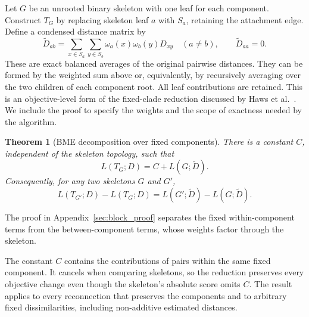 \documentclass[11pt,a4paper]{article}
\makeatletter
\DeclareRobustCommand{\_}{\ifmmode\nfss@text{\textunderscore}\else\textunderscore\allowbreak\fi}
\newtheorem{theorem}{Theorem}[section]
\theoremstyle{definition}
\makeatother
\begin{document}
Let $G$ be an unrooted binary skeleton with one leaf for each component.
Construct $T_G$ by replacing skeleton leaf $a$ with $S_a$, retaining the attachment edge.
Define a condensed distance matrix by
\begin{equation}
 \widetilde D_{ab}
 =\sum_{x\in S_a}\sum_{y\in S_b}
    \omega_a(x)\omega_b(y)D_{xy}\quad(a\ne b),
 \qquad \widetilde D_{aa}=0.
 \label{eq:condensed_D}
\end{equation}
These are exact balanced averages of the original pairwise distances.
They can be formed by the weighted sum above or, equivalently, by recursively averaging over the two children of each component root.
All leaf contributions are retained.
This is an objective-level form of the fixed-clade reduction discussed by Haws et al.~\cite[Section~2.4]{haws2011optimality}.
We include the proof to specify the weights and the scope of exactness needed by the algorithm.

\begin{theorem}[BME decomposition over fixed components]
\label{thm:clade_condense}
There is a constant $C$, independent of the skeleton topology, such that
\begin{equation}
 L(T_G;D)=C+L(G;\widetilde D).
 \label{eq:bme_condense_decomp}
\end{equation}
Consequently, for any two skeletons $G$ and $G'$,
\begin{equation}
 L(T_{G'};D)-L(T_G;D)
 =L(G';\widetilde D)-L(G;\widetilde D).
 \label{eq:condensed_delta}
\end{equation}
\end{theorem}
The proof in Appendix~\ref{sec:block_proof} separates the fixed within-component terms from the between-component terms, whose weights factor through the skeleton.

The constant $C$ contains the contributions of pairs within the same fixed component.
It cancels when comparing skeletons, so the reduction preserves every objective change even though the skeleton's absolute score omits $C$.
The result applies to every reconnection that preserves the components and to arbitrary fixed dissimilarities, including non-additive estimated distances.
\end{document}
